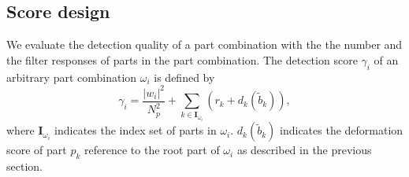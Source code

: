 \documentclass[10pt,twocolumn,letterpaper]{article}
\begin{document}


\subsection{Score design}
\label{subsec:score}
We evaluate the detection quality of a part combination with the the number and the filter responses of parts in the part combination.
The detection score $\gamma_i$ of an arbitrary part combination $\omega_i$ is defined by
\begin{equation}
   \label{eq:part_detection_score}
   \gamma_i =\frac{|w_i|^2}{N_p^2}  + \sum_{k \in \mathbf{I}_{\omega_i}} \left( r_k + d_k(\tilde{b}_k) \right),
\end{equation}
where $\mathbf{I}_{\omega_i}$ indicates the index set of parts in $\omega_i$. $d_k(\tilde{b}_k)$ indicates the deformation score of part $p_k$ reference to the root part of $\omega_i$ as described in the previous section.
\end{document}
